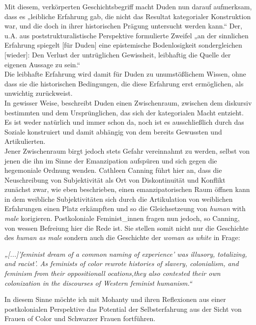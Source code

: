 \noindent Mit diesem, verkörperten Geschichtsbegriff macht Duden nun darauf aufmerksam,
dass es „leibliche Erfahrung gab, die nicht das Resultat kategorialer
Konstruktion war, und die doch in ihrer historischen Prägung untersucht werden
kann.“\footnotemark {} Der, u.A. aus poststrukturalistische Perspektive formulierte Zweifel
„an der sinnlichen Erfahrung spiegelt [für Duden] eine epistemische
Bodenlosigkeit sondergleichen [wieder]: Den Verlust der untrüglichen
Gewissheit, leibhaftig die Quelle der eigenen Aussage zu sein.“\footnotemark {}\\
Die leibhafte
Erfahrung wird damit für Duden zu unumstößlichem Wissen, ohne dass sie die
historischen Bedingungen, die diese Erfahrung erst ermöglichen, als unwichtig
zurückweist. \\
In gewisser Weise, beschreibt Duden einen Zwischenraum, zwischen
dem diskursiv bestimmten und dem Ursprünglichen, das sich der kategorialen
Macht entzieht. Es ist weder natürlich und immer schon da, noch ist es
ausschließlich durch das Soziale konstruiert und damit abhängig von dem bereits
Gewussten und Artikulierten. \\

\noindent Jener Zwischenraum birgt jedoch stets Gefahr vereinnahmt zu werden, selbst von
jenen die ihn im Sinne der Emanzipation aufspüren und sich gegen die
hegemoniale Ordnung wenden. Cathleen Canning\footnotemark {} führt hier an, dass die
Neuschreibung von Subjektivität als Ort von Diskontinuität und Konflikt
zunächst zwar, wie eben beschrieben, einen emanzipatorischen Raum öffnen kann
in dem weibliche Subjektivitäten sich durch die Artikulation von weiblichen
Erfahrungen einen Platz erkämpften und so die Gleichsetzeung von \textit{human} with
\textit{male} korigieren. Postkoloniale Feminist\_innen fragen nun jedoch, so Canning,
von wessen Befreiung hier die Rede ist. Sie stellen somit nicht nur die
Geschichte des \textit{human as male} sondern auch die Geschichte der \textit{woman as
white} in
Frage:
\begin{myenv}
 \textit{
 „[...]'feminist dream of a common naming of experience' was illusory,
 totalizing, and racist'. As feminists of color rewrote histories of slavery,
 colonialism, and feminism from their oppositionall ocations,they also
 contested their own colonization in the discourses of Western feminist
 humanism.“\footnotemark {} }
\end{myenv}
In diesem Sinne möchte ich mit Mohanty und ihren Reflexionen aus einer
postkolonialen Perspektive das Potential der Selbsterfahrung aus der Sicht von
Frauen of Color und Schwarzer Frauen fortführen.\\

